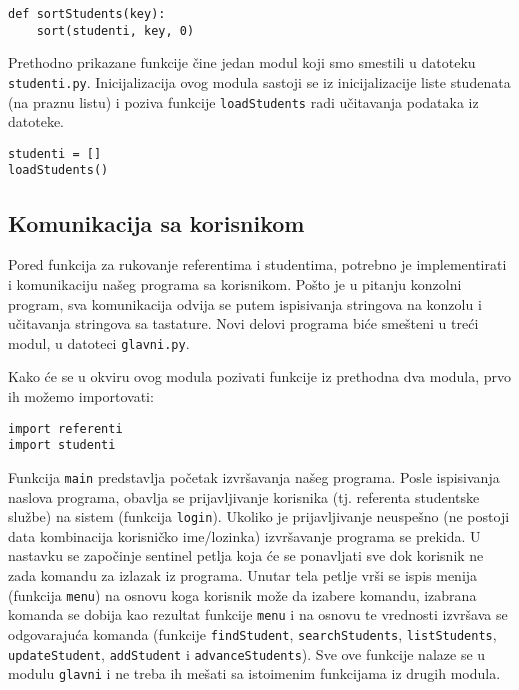 \documentclass[a4paper]{article}
\begin{document}
\begin{verbatim}
def sortStudents(key):
    sort(studenti, key, 0)
\end{verbatim}

Prethodno prikazane funkcije čine jedan modul koji smo smestili u datoteku
\texttt{studenti.py}. Inicijalizacija ovog modula sastoji se iz inicijalizacije
liste studenata (na praznu listu) i poziva funkcije \texttt{loadStudents} radi
učitavanja podataka iz datoteke.

\begin{verbatim}
studenti = []
loadStudents()
\end{verbatim}

\subsection{Komunikacija sa korisnikom}

Pored funkcija za rukovanje referentima i studentima, potrebno je implementirati
i komunikaciju našeg programa sa korisnikom. Pošto je u pitanju konzolni
program, sva komunikacija odvija se putem ispisivanja stringova na konzolu i
učitavanja stringova sa tastature. Novi delovi programa biće smešteni u treći
modul, u datoteci \texttt{glavni.py}.

Kako će se u okviru ovog modula pozivati funkcije iz prethodna dva modula, prvo
ih možemo importovati:

\begin{verbatim}
import referenti
import studenti
\end{verbatim}

Funkcija \texttt{main} predstavlja početak izvršavanja našeg programa. Posle
ispisivanja naslova programa, obavlja se prijavljivanje korisnika (tj. referenta
studentske službe) na sistem (funkcija \texttt{login}). Ukoliko je
prijavljivanje neuspešno (ne postoji data kombinacija korisničko ime/lozinka)
izvršavanje programa se prekida. U nastavku se započinje sentinel petlja koja će
se ponavljati sve dok korisnik ne zada komandu za izlazak iz programa. Unutar
tela petlje vrši se ispis menija (funkcija \texttt{menu}) na osnovu koga
korisnik može da izabere komandu, izabrana komanda se dobija kao rezultat
funkcije \texttt{menu} i na osnovu te vrednosti izvršava se odgovarajuća komanda
(funkcije \texttt{findStudent}, \texttt{searchStudents}, \texttt{listStudents},
\texttt{updateStudent}, \texttt{addStudent} i \texttt{advanceStudents}). Sve ove
funkcije nalaze se u modulu \texttt{glavni} i ne treba ih mešati sa istoimenim
funkcijama iz drugih modula.
\end{document}
